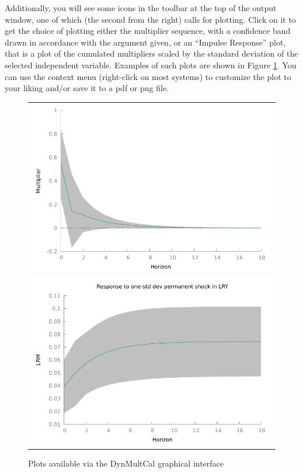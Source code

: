 \documentclass[a4paper,10pt]{article}
\begin{document}
Additionally, you will see some icons in the toolbar at the top of the
output window, one of which (the second from the right) calls for
plotting. Click on it to get the choice of plotting either the
multiplier sequence, with a confidence band drawn in accordance with
the argument given, or an ``Impulse Response'' plot, that is a plot of
the cumulated multipliers scaled by the standard deviation of the
selected independent variable. Examples of such plots are shown in
Figure \ref{fig:mults}. You can use the context menu (right-click on
most systems) to customize the plot to your liking and/or save it to a
\textsf{pdf} or \textsf{png} file.

\begin{figure}[htbp]
  \label{fig:mults}
  \begin{center}
  \begin{tabular}{c}
    \includegraphics[scale=0.75]{m_example} \\[10pt]
    \includegraphics[scale=0.75]{irf_example}
  \end{tabular}
  \caption{Plots available via the \textsf{DynMultCal} graphical
    interface}
  \end{center}
\end{figure}
\clearpage
\end{document}
